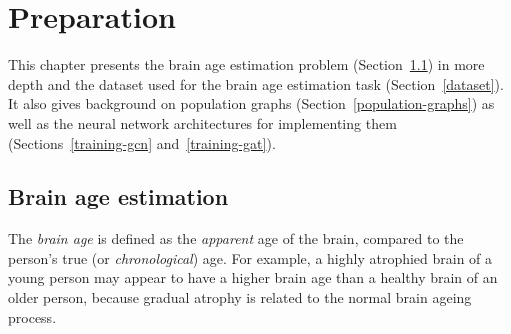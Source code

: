 \chapter{Preparation}



This chapter presents the brain age estimation problem (Section~\ref{brain-age-estimation}) in more depth and the dataset used for the brain age estimation task (Section~\ref{dataset}). It also gives background on population graphs (Section~\ref{population-graphs}) as well as the neural network architectures for implementing them (Sections~\ref{training-gcn} and~\ref{training-gat}).

\section{Brain age estimation}
\label{brain-age-estimation}

The \textit{brain age} is defined as the \textit{apparent} age of the brain, compared to the person's true (or \textit{chronological}) age. For example, a highly atrophied brain of a young person may appear to have a higher brain age than a healthy brain of an older person, because gradual atrophy is related to the normal brain ageing process. 

